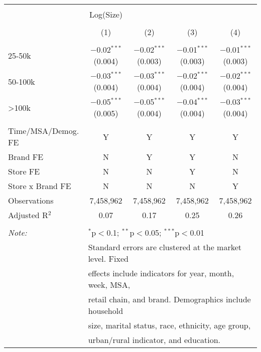 
\begin{table}[!htbp] \centering 
  \caption{} 
  \label{tab:packageSizeFull4100} 
\begin{tabular}{@{\extracolsep{5pt}}lcccc} 
\\[-1.8ex]\hline 
\hline \\[-1.8ex] 
 & Log(Size) &  &  &  \\ 
\\[-1.8ex] & (1) & (2) & (3) & (4)\\ 
\hline \\[-1.8ex] 
 25-50k & $-$0.02$^{***}$ (0.004) & $-$0.02$^{***}$ (0.003) & $-$0.01$^{***}$ (0.003) & $-$0.01$^{***}$ (0.003) \\ 
  50-100k & $-$0.03$^{***}$ (0.004) & $-$0.03$^{***}$ (0.004) & $-$0.02$^{***}$ (0.004) & $-$0.02$^{***}$ (0.004) \\ 
  >100k & $-$0.05$^{***}$ (0.005) & $-$0.05$^{***}$ (0.004) & $-$0.04$^{***}$ (0.004) & $-$0.03$^{***}$ (0.004) \\ 
 \hline \\[-1.8ex] 
Time/MSA/Demog. FE & Y & Y & Y & Y \\ 
Brand FE & N & Y & Y & N \\ 
Store FE & N & N & Y & N \\ 
Store x Brand FE & N & N & N & Y \\ 
Observations & 7,458,962 & 7,458,962 & 7,458,962 & 7,458,962 \\ 
Adjusted R$^{2}$ & 0.07 & 0.17 & 0.25 & 0.26 \\ 
\hline 
\hline \\[-1.8ex] 
\textit{Note:}  & \multicolumn{4}{l}{$^{*}$p$<$0.1; $^{**}$p$<$0.05; $^{***}$p$<$0.01} \\ 
 & \multicolumn{4}{l}{Standard errors are clustered at the market level. Fixed } \\ 
 & \multicolumn{4}{l}{effects include indicators for year, month, week, MSA, } \\ 
 & \multicolumn{4}{l}{retail chain, and brand. Demographics include household } \\ 
 & \multicolumn{4}{l}{size, marital status, race, ethnicity, age group, } \\ 
 & \multicolumn{4}{l}{urban/rural indicator, and education.} \\ 
\end{tabular} 
\end{table} 
